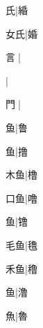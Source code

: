 \begin{multicols}{2}
{{氏}\mktsJzrVerticalBar{}{\cjk{}{\cnsym{}　}{\cnsym{}　}{\cnsym{}　}}|{\cjk{}緍}\par
{\cjk{}{\cnsym{}　}女氏}\mktsJzrVerticalBar{}{\cjk{}{\cnsym{}　}{\cnsym{}　}{\cnsym{}　}}|{\cjk{}婚}\par
{\cjk{}{\cnsym{}　}言{\cnjzr{}}}\mktsJzrVerticalBar{}{\cjk{}{\cnsym{}　}{\cnsym{}　}{\cnsym{}　}}|{}\par
{}\mktsJzrVerticalBar{}{\cjk{}{\cnsym{}　}{\cnsym{}　}{\cnsym{}　}}|{}\par
{\cjk{}{\cnsym{}　}門{\cnjzr{}}}\mktsJzrVerticalBar{}{\cjk{}{\cnsym{}　}{\cnsym{}　}{\cnsym{}　}}|{}\par
{\cjk{}{\cnsym{}　}{\cnsym{}　}鱼}\mktsJzrVerticalBar{}{\cjk{}{\cnsym{}　}{\cnsym{}　}{\cnsym{}　}}|{\cjk{}鲁}\par
{鱼}\mktsJzrVerticalBar{}{\cjk{}{\cnsym{}　}{\cnsym{}　}{\cnsym{}　}}|{\cjk{}撸}\par
{\cjk{}{\cnsym{}　}木鱼}\mktsJzrVerticalBar{}{\cjk{}{\cnsym{}　}{\cnsym{}　}{\cnsym{}　}}|{\cjk{}橹}\par
{\cjk{}{\cnsym{}　}口鱼}\mktsJzrVerticalBar{}{\cjk{}{\cnsym{}　}{\cnsym{}　}{\cnsym{}　}}|{\cjk{}噜}\par
{鱼}\mktsJzrVerticalBar{}{\cjk{}{\cnsym{}　}{\cnsym{}　}{\cnsym{}　}}|{\cjk{}镥}\par
{\cjk{}{\cnsym{}　}毛鱼}\mktsJzrVerticalBar{}{\cjk{}{\cnsym{}　}{\cnsym{}　}{\cnsym{}　}}|{\cjk{}氇}\par
{\cjk{}{\cnsym{}　}禾鱼}\mktsJzrVerticalBar{}{\cjk{}{\cnsym{}　}{\cnsym{}　}{\cnsym{}　}}|{\cjk{}穞}\par
{鱼}\mktsJzrVerticalBar{}{\cjk{}{\cnsym{}　}{\cnsym{}　}{\cnsym{}　}}|{\cjk{}澛}\par
{\cjk{}{\cnsym{}　}{\cnsym{}　}魚}\mktsJzrVerticalBar{}{\cjk{}{\cnsym{}　}{\cnsym{}　}{\cnsym{}　}}|{\cjk{}魯}\par
}
\end{multicols}
